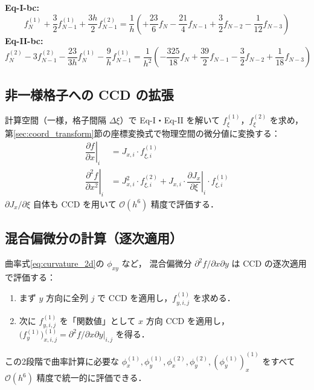 \documentclass[12pt, a4paper, titlepage]{article}
\newcommand{\jp}[1]{{\normalfont\jpfont #1}}
\newcommand{\pd}[2]{\dfrac{\partial #1}{\partial #2}}
\newcommand{\pdd}[2]{\dfrac{\partial^2 #1}{\partial #2^2}}
\newcommand{\Ord}[1]{\mathcal{O}(#1)}
\newcommand{\fp}[1]{f^{(1)}_{#1}}
\newcommand{\fpp}[1]{f^{(2)}_{#1}}
\begin{document}
\begin{tcolorbox}[mybox, title={\jp{右境界スキーム（$i=N$，$\Ord{h^5}$）}}]
\textbf{Eq-I-bc:}
\begin{equation}
  \fp{N} + \frac{3}{2}\fp{N-1} + \frac{3h}{2}\fpp{N-1}
  = \frac{1}{h}\!\left(
    +\frac{23}{6}f_N
    - \frac{21}{4}f_{N-1}
    + \frac{3}{2}f_{N-2}
    - \frac{1}{12}f_{N-3}
  \right)
  \label{eq:bc_I_right}
\end{equation}
\textbf{Eq-II-bc:}
\begin{equation}
  \fpp{N} - 3\fpp{N-1}
  - \frac{23}{3h}\fp{N}
  - \frac{9}{h}\fp{N-1}
  = \frac{1}{h^2}\!\left(
    -\frac{325}{18}f_N
    + \frac{39}{2}f_{N-1}
    - \frac{3}{2}f_{N-2}
    + \frac{1}{18}f_{N-3}
  \right)
  \label{eq:bc_II_right}
\end{equation}
\end{tcolorbox}

\subsection{\jp{非一様格子への CCD の拡張}}

\jp{計算空間（一様，格子間隔 $\Delta\xi$）で Eq-I・Eq-II を解いて
$f^{(1)}_{\xi}$，$f^{(2)}_{\xi}$ を求め，
第\ref{sec:coord_transform}節の座標変換式で物理空間の微分値に変換する：}
\begin{align}
  \left.\pd{f}{x}\right|_i
    &= J_{x,i}\cdot f^{(1)}_{\xi,i}
  \label{eq:nonuniform_1st}\\[6pt]
  \left.\pdd{f}{x}\right|_i
    &= J_{x,i}^2\cdot f^{(2)}_{\xi,i}
     + J_{x,i}\cdot\left.\pd{J_x}{\xi}\right|_i \cdot f^{(1)}_{\xi,i}
  \label{eq:nonuniform_2nd}
\end{align}
\jp{$\partial J_x/\partial\xi$ 自体も CCD を用いて $\Ord{h^6}$ 精度で評価する．}

\subsection{\jp{混合偏微分の計算（逐次適用）}}

\jp{曲率式\eqref{eq:curvature_2d}の $\phi_{xy}$ など，
混合偏微分 $\partial^2 f/\partial x\partial y$ は CCD の逐次適用で評価する：}
\begin{enumerate}
  \item \jp{まず $y$ 方向に全列 $j$ で CCD を適用し，$f^{(1)}_{y,i,j}$ を求める．}
  \item \jp{次に $f^{(1)}_{y,i,j}$ を「関数値」として $x$ 方向 CCD を適用し，
        $\bigl(f^{(1)}_y\bigr)^{(1)}_{x,i,j} = \partial^2 f/\partial x\partial y|_{i,j}$ を得る．}
\end{enumerate}
\jp{この2段階で曲率計算に必要な
$\phi^{(1)}_x, \phi^{(1)}_y, \phi^{(2)}_x, \phi^{(2)}_y, (\phi^{(1)}_y)^{(1)}_x$
をすべて $\Ord{h^6}$ 精度で統一的に評価できる．}
\end{document}
